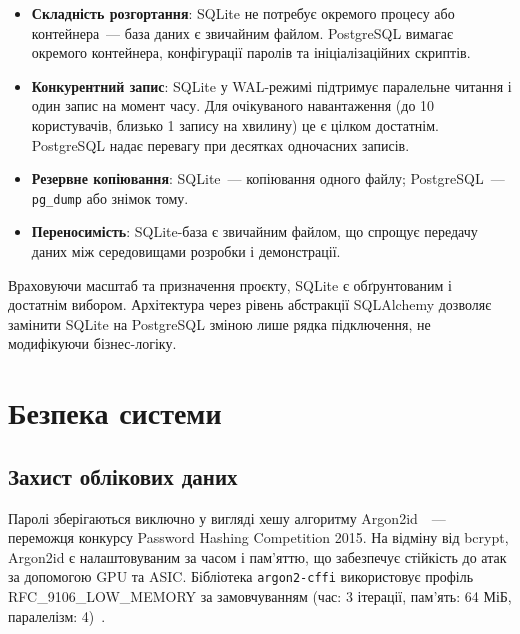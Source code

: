 \begin{itemize}
  \item \textbf{Складність розгортання}: SQLite не потребує окремого
    процесу або контейнера~--- база даних є звичайним файлом.
    PostgreSQL вимагає окремого контейнера, конфігурації паролів
    та ініціалізаційних скриптів.

  \item \textbf{Конкурентний запис}: SQLite у WAL-режимі підтримує
    паралельне читання і один запис на момент часу. Для очікуваного
    навантаження (до 10 користувачів, близько 1 запису на хвилину)
    це є цілком достатнім. PostgreSQL надає перевагу при десятках
    одночасних записів.

  \item \textbf{Резервне копіювання}: SQLite~--- копіювання одного
    файлу; PostgreSQL~--- \texttt{pg\_dump} або знімок тому.

  \item \textbf{Переносимість}: SQLite-база є звичайним файлом,
    що спрощує передачу даних між середовищами розробки і
    демонстрації.
\end{itemize}

Враховуючи масштаб та призначення проєкту, SQLite є обґрунтованим
і достатнім вибором. Архітектура через рівень
абстракції SQLAlchemy дозволяє замінити SQLite на PostgreSQL
зміною лише рядка підключення, не модифікуючи бізнес-логіку.

\section{Безпека системи}
\label{sec:security}

\subsection{Захист облікових даних}

Паролі зберігаються виключно у вигляді хешу алгоритму
Argon2id~\cite{biryukov2016argon2}~--- переможця конкурсу Password
Hashing Competition 2015. На відміну від bcrypt, Argon2id є
налаштовуваним за часом і пам'яттю, що забезпечує стійкість до
атак за допомогою GPU та ASIC. Бібліотека \texttt{argon2-cffi} використовує
профіль RFC\_9106\_LOW\_MEMORY за замовчуванням
(час: 3 ітерації, пам'ять: 64 МіБ, паралелізм: 4)~\cite{owasp_password_storage}.

